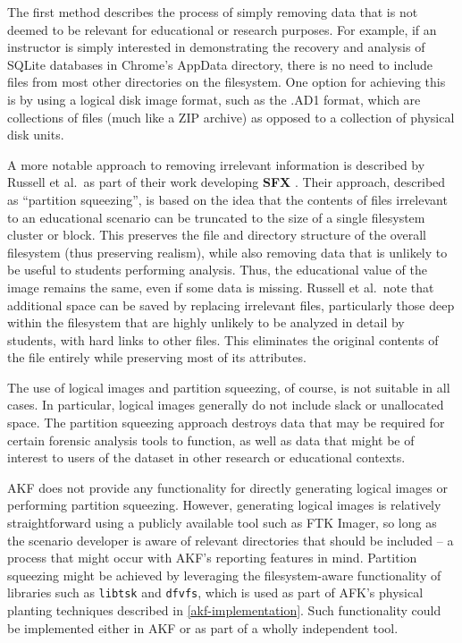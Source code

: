 \documentclass[letterpaper,12pt]{report}
\newcommand{\passthrough}[1]{#1}
\begin{document}
The first method describes the process of simply removing data that is
not deemed to be relevant for educational or research purposes. For
example, if an instructor is simply interested in demonstrating the
recovery and analysis of SQLite databases in Chrome's AppData directory,
there is no need to include files from most other directories on the
filesystem. One option for achieving this is by using a logical disk
image format, such as the .AD1 format, which are collections of files
(much like a ZIP archive) as opposed to a collection of physical disk
units.

A more notable approach to removing irrelevant information is described
by Russell et al.~as part of their work developing \textbf{SFX}
\cite{russellForensicImageDescription2012}. Their approach,
described as ``partition squeezing'', is based on the idea that the
contents of files irrelevant to an educational scenario can be truncated
to the size of a single filesystem cluster or block. This preserves the
file and directory structure of the overall filesystem (thus preserving
realism), while also removing data that is unlikely to be useful to
students performing analysis. Thus, the educational value of the image
remains the same, even if some data is missing. Russell et al.~note that
additional space can be saved by replacing irrelevant files,
particularly those deep within the filesystem that are highly unlikely
to be analyzed in detail by students, with hard links to other files.
This eliminates the original contents of the file entirely while
preserving most of its attributes.

The use of logical images and partition squeezing, of course, is not
suitable in all cases. In particular, logical images generally do not
include slack or unallocated space. The partition squeezing approach
destroys data that may be required for certain forensic analysis tools
to function, as well as data that might be of interest to users of the
dataset in other research or educational contexts.

AKF does not provide any functionality for directly generating logical
images or performing partition squeezing. However, generating logical
images is relatively straightforward using a publicly available tool
such as FTK Imager, so long as the scenario developer is aware of
relevant directories that should be included -- a process that might
occur with AKF's reporting features in mind. Partition squeezing might
be achieved by leveraging the filesystem-aware functionality of
libraries such as \passthrough{\lstinline!libtsk!} and
\passthrough{\lstinline!dfvfs!}, which is used as part of AFK's physical
planting techniques described in \autoref{akf-implementation}. Such functionality could be implemented either in
AKF or as part of a wholly independent tool.
\end{document}
